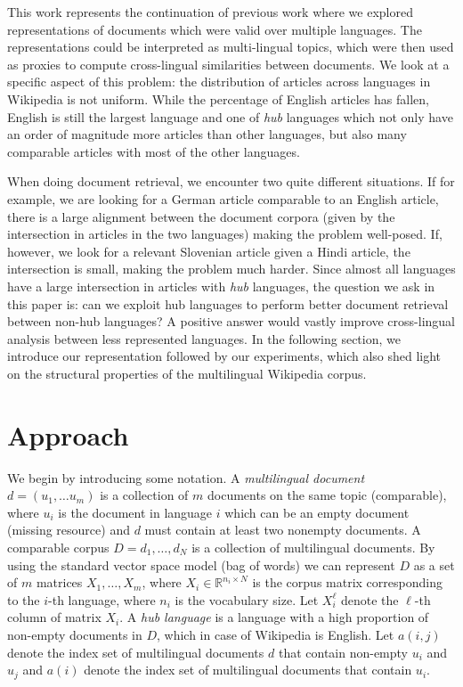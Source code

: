 \documentclass{article} %
\newcommand{\RR}{\mathbb{R}}
\begin{document}
This work represents the continuation of previous work \cite{nips, iti, nips2, sikdd}
where we explored representations of documents which were valid
over multiple languages.  The representations could be interpreted
as multi-lingual topics, which were then used as proxies to compute
cross-lingual similarities between documents.
%
We look at a specific aspect of this problem: the distribution of
articles across languages in Wikipedia is not uniform. While the
percentage of English articles has fallen, English is still the
largest language and one of \emph{hub} languages which not only
have an order of magnitude more articles than other languages,
but also many comparable articles with most of the other languages.

When doing document retrieval, we encounter two quite different situations. If for example, we are looking for a
German article comparable to an English article, there is a large
alignment between the document corpora (given by the intersection
in articles in the two languages) making the problem
well-posed. If, however, we look for a relevant
Slovenian article given a Hindi article, the intersection is small,
making the problem much harder.
Since almost all languages have a large intersection in
articles with \emph{hub} languages, the question we ask in
this paper is: can we exploit hub languages to perform better
document retrieval between non-hub languages? A positive answer would vastly improve cross-lingual analysis between
less represented languages. In the following section, we
introduce our representation followed by our experiments, which
also shed light on the structural properties of the multilingual
Wikipedia corpus.

\section{Approach}
We begin by introducing some notation. A \emph{multilingual document} $d = (u_1,\ldots u_m)$ is a collection of $m$ documents on the same topic (comparable), where $u_i$ is the document in language $i$ which can be an empty document (missing resource) and $d$ must contain at least two nonempty documents. A comparable corpus $D = {d_1, \ldots, d_N}$ is a collection of multilingual documents. By using the standard vector space model (bag of words) we can represent $D$ as a set of $m$ matrices $X_1,\ldots,X_m$, where $X_i \in \RR^{n_i \times N}$ is the corpus matrix corresponding to the $i$-th language, where $n_i$ is the vocabulary size. Let $X_i^{\ell}$ denote the $\ell$-th column of matrix $X_i$. A \emph{hub language} is a language with a high proportion of non-empty documents in $D$, which in case of Wikipedia is English. Let $a(i,j)$ denote the index set of multilingual documents $d$ that contain non-empty $u_i$ and $u_j$ and $a(i)$ denote the index set of multilingual documents that contain $u_i$.
\end{document}
